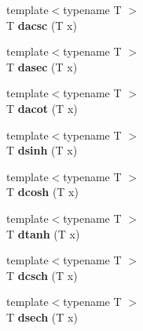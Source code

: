 \begin{DoxyCompactItemize}
\item 
\hypertarget{namespace_d_r_d_s_p_a47cf40b3ac58724b35ec0b9251243cb9}{{\footnotesize template$<$typename T $>$ }\\T {\bfseries dacsc} (T x)}\label{namespace_d_r_d_s_p_a47cf40b3ac58724b35ec0b9251243cb9}

\item 
\hypertarget{namespace_d_r_d_s_p_a22081226e768e095f0ea19c59a359a25}{{\footnotesize template$<$typename T $>$ }\\T {\bfseries dasec} (T x)}\label{namespace_d_r_d_s_p_a22081226e768e095f0ea19c59a359a25}

\item 
\hypertarget{namespace_d_r_d_s_p_a8e30ff85e5210a6d9c3cdebc99a5879c}{{\footnotesize template$<$typename T $>$ }\\T {\bfseries dacot} (T x)}\label{namespace_d_r_d_s_p_a8e30ff85e5210a6d9c3cdebc99a5879c}

\item 
\hypertarget{namespace_d_r_d_s_p_a09e0111902206a404a6de12cacdeea61}{{\footnotesize template$<$typename T $>$ }\\T {\bfseries dsinh} (T x)}\label{namespace_d_r_d_s_p_a09e0111902206a404a6de12cacdeea61}

\item 
\hypertarget{namespace_d_r_d_s_p_a5a63f17784421984c84b9dba3b51173f}{{\footnotesize template$<$typename T $>$ }\\T {\bfseries dcosh} (T x)}\label{namespace_d_r_d_s_p_a5a63f17784421984c84b9dba3b51173f}

\item 
\hypertarget{namespace_d_r_d_s_p_a46144486b16116ea73799ce0244b82ff}{{\footnotesize template$<$typename T $>$ }\\T {\bfseries dtanh} (T x)}\label{namespace_d_r_d_s_p_a46144486b16116ea73799ce0244b82ff}

\item 
\hypertarget{namespace_d_r_d_s_p_a7ca494bf06101b90a9ae64958f89ad4b}{{\footnotesize template$<$typename T $>$ }\\T {\bfseries dcsch} (T x)}\label{namespace_d_r_d_s_p_a7ca494bf06101b90a9ae64958f89ad4b}

\item 
\hypertarget{namespace_d_r_d_s_p_a57a0e300085b72bc5ba852c4ff109c99}{{\footnotesize template$<$typename T $>$ }\\T {\bfseries dsech} (T x)}\label{namespace_d_r_d_s_p_a57a0e300085b72bc5ba852c4ff109c99}


\end{DoxyCompactItemize}
